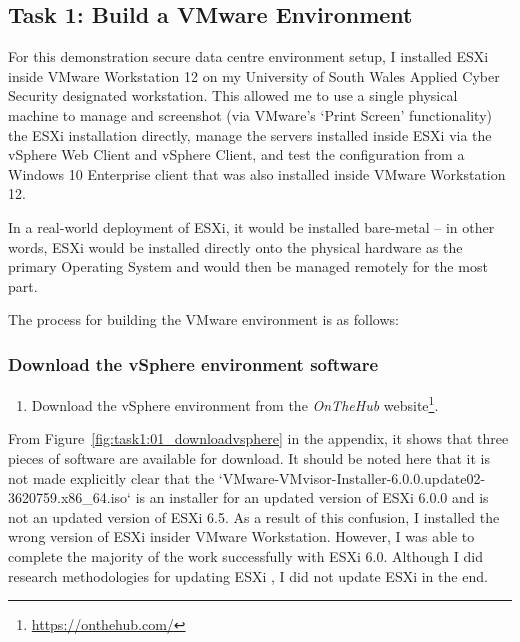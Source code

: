 \pagebreak
\subsection{Task 1: Build a VMware Environment}
For this demonstration secure data centre environment setup, I installed ESXi inside VMware Workstation 12 on my University of South Wales Applied Cyber Security designated workstation. This allowed me to use a single physical machine to manage and screenshot (via VMware's `Print Screen' functionality) the ESXi installation directly, manage the servers installed inside ESXi via the vSphere Web Client and vSphere Client, and test the configuration from a Windows 10 Enterprise client that was also installed inside VMware Workstation 12.

In a real-world deployment of ESXi, it would be installed bare-metal -- in other words, ESXi would be installed directly onto the physical hardware as the primary Operating System and would then be managed remotely for the most part.

\bigskip
\noindent The process for building the VMware environment is as follows:

\subsubsection{Download the vSphere environment software}
\begin{enumerate}[series=task1methodology]
  \item Download the vSphere environment from the \textit{OnTheHub\textsuperscript{\textregistered}} website\footnote{\url{https://onthehub.com/}}.
\end{enumerate}

\noindent From Figure~\ref{fig:task1:01_downloadvsphere} in the  appendix, it shows that three pieces of software are available for download. It should be noted here that it is not made explicitly clear that the `VMware-VMvisor-Installer-6.0.0.update02-3620759.x86\_64.iso` is an installer for an updated version of ESXi 6.0.0 and is not an updated version of ESXi 6.5. As a result of this confusion, I installed the wrong version of ESXi insider VMware Workstation.
However, I was able to complete the majority of the work successfully with ESXi 6.0. Although I did research methodologies for updating ESXi \citep{site:vmwaredocs:esxihostupdateprocess:20180520,site:vmwaredocs:esxiupgradeesxcli:20160915}, I did not update ESXi in the end.

